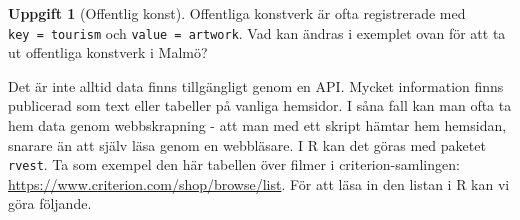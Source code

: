\documentclass[
]{book}
\newenvironment{Shaded}{\begin{snugshade}}{\end{snugshade}}
\newcommand{\AttributeTok}[1]{\textcolor[rgb]{0.77,0.63,0.00}{#1}}
\newcommand{\DecValTok}[1]{\textcolor[rgb]{0.00,0.00,0.81}{#1}}
\newcommand{\FunctionTok}[1]{\textcolor[rgb]{0.00,0.00,0.00}{#1}}
\newcommand{\NormalTok}[1]{#1}
\newcommand{\OtherTok}[1]{\textcolor[rgb]{0.56,0.35,0.01}{#1}}
\newcommand{\SpecialCharTok}[1]{\textcolor[rgb]{0.00,0.00,0.00}{#1}}
\newcommand{\StringTok}[1]{\textcolor[rgb]{0.31,0.60,0.02}{#1}}
\theoremstyle{definition}
\theoremstyle{definition}
\theoremstyle{definition}
\newtheorem{exercise}{Uppgift}[chapter]
\theoremstyle{definition}
\theoremstyle{remark}
\begin{document}
\begin{Shaded}
\end{Shaded}

\begin{exercise}[Offentlig konst]
Offentliga konstverk är ofta registrerade med \texttt{key\ =\ \textquotesingle{}tourism\textquotesingle{}} och \texttt{value\ =\ \textquotesingle{}artwork\textquotesingle{}}. Vad kan ändras i exemplet ovan för att ta ut offentliga konstverk i Malmö?
\end{exercise}

Det är inte alltid data finns tillgängligt genom en API. Mycket information finns publicerad som text eller tabeller på vanliga hemsidor. I såna fall kan man ofta ta hem data genom webbskrapning - att man med ett skript hämtar hem hemsidan, snarare än att själv läsa genom en webbläsare. I R kan det göras med paketet \texttt{rvest}. Ta som exempel den här tabellen över filmer i criterion-samlingen: \url{https://www.criterion.com/shop/browse/list}. För att läsa in den listan i R kan vi göra följande.
\end{document}
